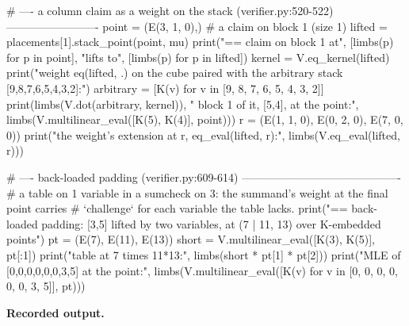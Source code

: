 \begin{srccode}
# ---- a column claim as a weight on the stack (verifier.py:520-522) -------------------------
point = (E(3, 1, 0),)  # a claim on block 1 (size 1)
lifted = placements[1].stack_point(point, mu)
print("== claim on block 1 at", [limbs(p) for p in point], "lifts to", [limbs(p) for p in lifted])
kernel = V.eq_kernel(lifted)
print("weight eq(lifted, .) on the cube paired with the arbitrary stack [9,8,7,6,5,4,3,2]:")
arbitrary = [K(v) for v in [9, 8, 7, 6, 5, 4, 3, 2]]
print(limbs(V.dot(arbitrary, kernel)), "  block 1 of it, [5,4], at the point:", limbs(V.multilinear_eval([K(5), K(4)], point)))
r = (E(1, 1, 0), E(0, 2, 0), E(7, 0, 0))
print("the weight's extension at r, eq_eval(lifted, r):", limbs(V.eq_eval(lifted, r)))

# ---- back-loaded padding (verifier.py:609-614) -------------------------------------------
# a table on 1 variable in a sumcheck on 3: the summand's weight at the final point carries
# `challenge` for each variable the table lacks.
print("== back-loaded padding: [3,5] lifted by two variables, at (7 | 11, 13) over K-embedded points")
pt = (E(7), E(11), E(13))
short = V.multilinear_eval([K(3), K(5)], pt[:1])
print("table at 7 times 11*13:", limbs(short * pt[1] * pt[2]))
print("MLE of [0,0,0,0,0,0,3,5] at the point:", limbs(V.multilinear_eval([K(v) for v in [0, 0, 0, 0, 0, 0, 3, 5]], pt)))
\end{srccode}

\textbf{Recorded output.}

